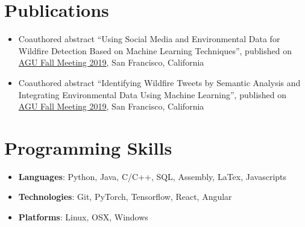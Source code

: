 \documentclass[letterpaper,11pt]{article}
\newcommand{\resumeItem}[2]{
  \item\small{
    \textbf{#1}{: #2 \vspace{-2pt}}
  }
}
\newcommand{\resumeSubItem}[2]{\resumeItem{#1}{#2}\vspace{-4pt}}
\newcommand{\resumeSubHeadingListStart}{\begin{itemize}[leftmargin=*]}
\newcommand{\resumeSubHeadingListEnd}{\end{itemize}}
\newcommand{\resumeItemListEnd}{\end{itemize}\vspace{-5pt}}
\begin{document}
      
        
%

\section{Publications}
\begin{itemize}
       
       \item Coauthored abstract ``Using Social Media and Environmental Data for Wildfire Detection Based on Machine Learning Techniques'', published on \href{https://www.agu.org/fall-meeting}{AGU Fall Meeting 2019}, San Francisco, California
       \item Coauthored abstract ``Identifying Wildfire Tweets by Semantic Analysis and Integrating Environmental Data Using Machine Learning'', published on \href{https://www.agu.org/fall-meeting}{AGU Fall Meeting 2019}, San Francisco, California
       
\end{itemize}



\section{Programming Skills}
 \resumeSubHeadingListStart
   \item{
      \textbf{Languages}{: Python, Java, C/C++, SQL, Assembly, LaTex, Javascripts}
   }
   \item{
      \textbf{Technologies}{: Git, PyTorch, Tensorflow, React, Angular}
   }
   \item{
      \textbf{Platforms}{: Linux, OSX, Windows}
   }
 \resumeSubHeadingListEnd
 
   


\end{document}
